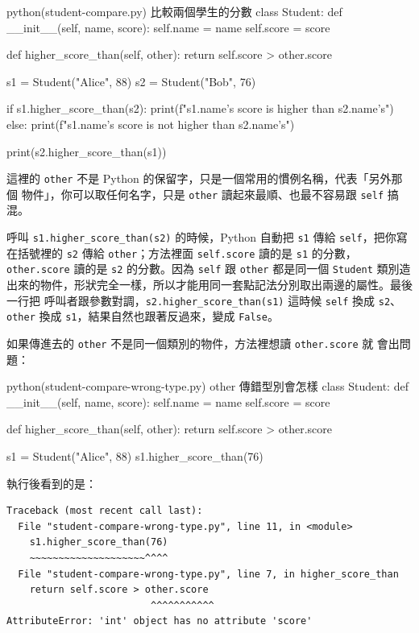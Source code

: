\begin{example}{python}{(student-compare.py) 比較兩個學生的分數}
class Student:
    def __init__(self, name, score):
        self.name = name
        self.score = score

    def higher_score_than(self, other):
        return self.score > other.score


s1 = Student("Alice", 88)
s2 = Student("Bob", 76)

if s1.higher_score_than(s2):
    print(f"{s1.name}'s score is higher than {s2.name}'s")
else:
    print(f"{s1.name}'s score is not higher than {s2.name}'s")

print(s2.higher_score_than(s1))
\end{example}


這裡的 \texttt{other} 不是 Python 的保留字，只是一個常用的慣例名稱，代表「另外那個
物件」，你可以取任何名字，只是 \texttt{other} 讀起來最順、也最不容易跟 \texttt{self}
搞混。

呼叫 \texttt{s1.higher\_score\_than(s2)} 的時候，Python 自動把 \texttt{s1} 傳給
\texttt{self}，把你寫在括號裡的 \texttt{s2} 傳給 \texttt{other}；方法裡面
\texttt{self.score} 讀的是 \texttt{s1} 的分數，\texttt{other.score} 讀的是
\texttt{s2} 的分數。因為 \texttt{self} 跟 \texttt{other} 都是同一個 \texttt{Student}
類別造出來的物件，形狀完全一樣，所以才能用同一套點記法分別取出兩邊的屬性。最後一行把
呼叫者跟參數對調，\texttt{s2.higher\_score\_than(s1)} 這時候 \texttt{self} 換成
\texttt{s2}、\texttt{other} 換成 \texttt{s1}，結果自然也跟著反過來，變成 \texttt{False}。

如果傳進去的 \texttt{other} 不是同一個類別的物件，方法裡想讀 \texttt{other.score} 就
會出問題：

\begin{example}{python}{(student-compare-wrong-type.py) other 傳錯型別會怎樣}
class Student:
    def __init__(self, name, score):
        self.name = name
        self.score = score

    def higher_score_than(self, other):
        return self.score > other.score


s1 = Student("Alice", 88)
s1.higher_score_than(76)
\end{example}

執行後看到的是：

\begin{verbatim}
Traceback (most recent call last):
  File "student-compare-wrong-type.py", line 11, in <module>
    s1.higher_score_than(76)
    ~~~~~~~~~~~~~~~~~~~~^^^^
  File "student-compare-wrong-type.py", line 7, in higher_score_than
    return self.score > other.score
                         ^^^^^^^^^^^
AttributeError: 'int' object has no attribute 'score'
\end{verbatim}

